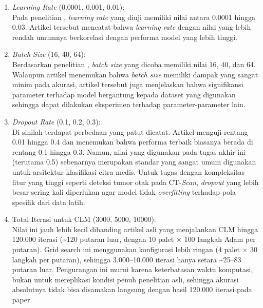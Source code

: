 \begin{enumerate}
	\item \textit{Learning Rate} (0.0001, 0.001, 0.01): \\
	Pada penelitian \textcite{wojciuk2024improving}, \textit{learning rate} yang diuji memiliki nilai antara 0.0001 hingga 0.03. Artikel tersebut mencatat bahwa \textit{learning rate} dengan nilai yang lebih rendah umumnya berkorelasi dengan performa model yang lebih tinggi.
	
	\item \textit{Batch Size} (16, 40, 64): \\
	Berdasarkan penelitian \textcite{wojciuk2024improving}, \textit{batch size} yang dicoba memiliki nilai 16, 40, dan 64. Walaupun artikel menemukan bahwa \textit{batch size} memiliki dampak yang sangat minim pada akurasi, artikel tersebut juga menjelaskan bahwa signifikansi parameter terhadap model bergantung kepada dataset yang digunakan sehingga dapat dilakukan eksperimen terhadap parameter-parameter lain.
	
	\item \textit{Dropout Rate} (0.1, 0.2, 0.3): \\
	Di sinilah terdapat perbedaan yang patut dicatat. Artikel \textcite{wojciuk2024improving} menguji rentang 0.01 hingga 0.4 dan menemukan bahwa performa terbaik biasanya berada di rentang 0.1 hingga 0.3. Namun, nilai yang digunakan pada tugas akhir ini (terutama 0.5) sebenarnya merupakan standar yang sangat umum digunakan untuk arsitektur klasifikasi citra medis. Untuk tugas dengan kompleksitas fitur yang tinggi seperti deteksi tumor otak pada CT-\textit{Scan}, \textit{dropout} yang lebih besar sering kali diperlukan agar model tidak \textit{overfitting} terhadap pola spesifik dari data latih. 
	
	\item Total Iterasi untuk CLM (3000, 5000, 10000): \\
	Nilai ini jauh lebih kecil dibanding artikel asli \textcite{wozniak2021deep} yang menjalankan CLM hingga 120.000 iterasi (\textasciitilde120 putaran luar, dengan 10 palet × 100 langkah Adam per putaran). Grid search ini menggunakan konfigurasi lebih ringan (4 palet × 30 langkah per putaran), sehingga 3.000–10.000 iterasi hanya setara \textasciitilde25–83 putaran luar. Pengurangan ini murni karena keterbatasan waktu komputasi, bukan untuk mereplikasi kondisi penuh penelitian asli, sehingga akurasi absolutnya tidak bisa disamakan langsung dengan hasil 120.000 iterasi pada paper.
\end{enumerate}


